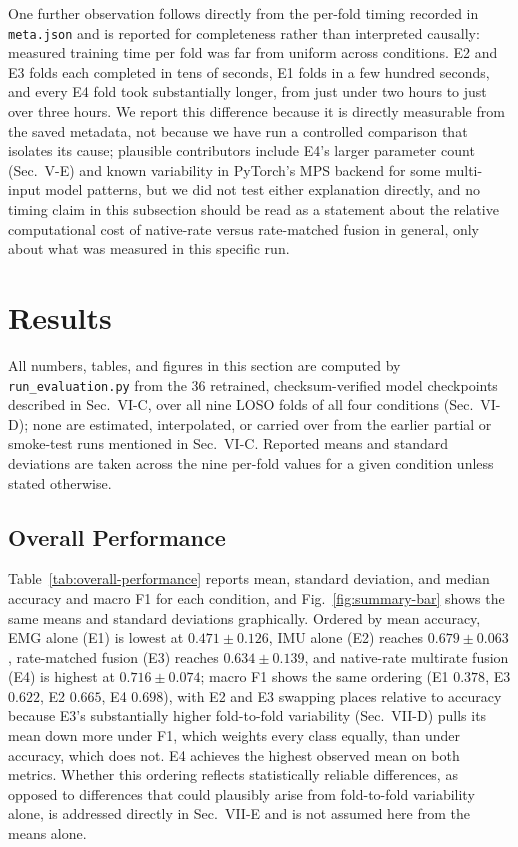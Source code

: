 \documentclass[conference]{IEEEtran}
\begin{document}
One further observation follows directly from the per-fold timing
recorded in \texttt{meta.json} and is reported for completeness
rather than interpreted causally: measured training time per fold
was far from uniform across conditions. E2 and E3 folds each
completed in tens of seconds, E1 folds in a few hundred seconds, and
every E4 fold took substantially longer, from just under two hours
to just over three hours. We report this difference because it is
directly measurable from the saved metadata, not because we have run
a controlled comparison that isolates its cause; plausible
contributors include E4's larger parameter count (Sec.~V-E) and
known variability in PyTorch's MPS backend for some multi-input
model patterns, but we did not test either explanation directly, and
no timing claim in this subsection should be read as a statement
about the relative computational cost of native-rate versus
rate-matched fusion in general, only about what was measured in this
specific run.

\section{Results}
\label{sec:results}

All numbers, tables, and figures in this section are computed by
\texttt{run\_evaluation.py} from the 36 retrained, checksum-verified
model checkpoints described in Sec.~VI-C, over all nine LOSO folds of
all four conditions (Sec.~VI-D); none are estimated, interpolated, or
carried over from the earlier partial or smoke-test runs mentioned in
Sec.~VI-C. Reported means and standard deviations are taken across
the nine per-fold values for a given condition unless stated
otherwise.

\subsection{Overall Performance}
\label{subsec:results-overall}

Table~\ref{tab:overall-performance} reports mean, standard deviation,
and median accuracy and macro F1 for each condition, and
Fig.~\ref{fig:summary-bar} shows the same means and standard
deviations graphically. Ordered by mean accuracy, EMG alone (E1) is
lowest at $0.471 \pm 0.126$, IMU alone (E2) reaches $0.679 \pm 0.063$,
rate-matched fusion (E3) reaches $0.634 \pm 0.139$, and native-rate
multirate fusion (E4) is highest at $0.716 \pm 0.074$; macro F1 shows
the same ordering (E1 $0.378$, E3 $0.622$, E2 $0.665$, E4 $0.698$),
with E2 and E3 swapping places relative to accuracy because E3's
substantially higher fold-to-fold variability (Sec.~VII-D) pulls its
mean down more under F1, which weights every class equally, than
under accuracy, which does not. E4 achieves the highest observed mean
on both metrics. Whether this ordering reflects statistically
reliable differences, as opposed to differences that could plausibly
arise from fold-to-fold variability alone, is addressed directly in
Sec.~VII-E and is not assumed here from the means alone.
\end{document}
